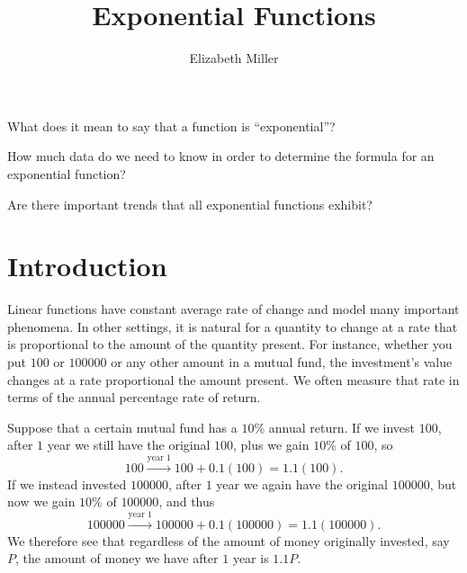 \documentclass[nooutcomes]{ximera}
\author{Elizabeth Miller}
\title{Exponential Functions}
\begin{document}
\begin{abstract}
  
\end{abstract}
\maketitle



\begin{motivatingQuestions}
\item What does it mean to say that a function is ``exponential”?
\item How much data do we need to know in order to determine the formula for an exponential function?
\item Are there important trends that all exponential functions exhibit?
\end{motivatingQuestions}



\section{Introduction}
Linear functions have constant average rate of change and model many important phenomena.  In other settings, it is natural for a quantity to change at a rate that is proportional to the amount of the quantity present.  For instance, whether you put \textdollar{}\(100\) or \textdollar{}\(100000\) or any other amount in a mutual fund, the investment's value changes at a rate proportional the amount present.  We often measure that rate in terms of the annual percentage rate of return.

Suppose that a certain mutual fund has a \(10\)\% annual return.  If we invest \textdollar{}\(100\), after \(1\) year we still have the original \textdollar{}\(100\), plus we gain \(10\)\% of \textdollar{}\(100\), so%
\begin{equation*}
100 \xrightarrow{\text{year } 1} 100 + 0.1(100) = 1.1(100)\text{.}
\end{equation*}
If we instead invested \textdollar{}\(100000\), after \(1\) year we again have the original \textdollar{}\(100000\), but now we gain \(10\)\% of \textdollar{}\(100000\), and thus%
\begin{equation*}
100000 \xrightarrow{\text{year } 1} 100000 + 0.1(100000) = 1.1(100000)\text{.}
\end{equation*}
We therefore see that regardless of the amount of money originally invested, say \(P\), the amount of money we have after \(1\) year is \(1.1P\).
\end{document}
